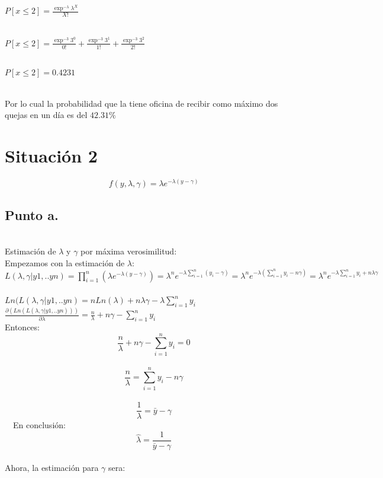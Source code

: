 \documentclass[letterpaper,12pt,onecolumn,titlepage]{article}
\begin{document}
~\\ $P[x\le2]= \frac{\exp^{-\lambda}\lambda^{X}}{X!}$

~\\ $P[x\le2]= \frac{\exp^{-3}3^{0}}{0!} + 
			 \frac{\exp^{-3}3^{1}}{1!} + 
			 \frac{\exp^{-3}3^{2}}{2!}$
			 
~\\ $P[x\le2]= 0.4231 $

~\\ Por lo cual la probabilidad que la tiene oficina de recibir como m\'{a}ximo dos quejas en un d\'{i}a es del {$42.31\%$}

\pagebreak\section{Situaci\'{o}n 2}
$$f(y,\lambda,\gamma)=\lambda e^{-\lambda(y-\gamma)}$$
\subsection{Punto a.}
~\\Estimaci\'{o}n de $\lambda$ y $\gamma$ por m\'{a}xima verosimilitud:
~\\ Empezamos con la estimaci\'{o}n de $\lambda$:
~\\ $L(\lambda,\gamma |y1,..yn)=\prod \limits_{i=1}^{n}(\lambda e^{-\lambda (y-\gamma)})=\lambda^n e^{-\lambda \sum \limits_{i=1}^{n}({y_{i}-\gamma})}=\lambda^n e^{-\lambda (\sum \limits_{i=1}^{n}{y_{i}}-n\gamma)}=\lambda^n e^{-\lambda\sum\limits_{i=1}^{n}{y_{i}}+n\lambda\gamma}$
~\\ $Ln(L(\lambda,\gamma |y1,..yn)=nLn(\lambda)+n\lambda\gamma-\lambda\sum\limits_{i=1}^{n}{y_{i}}$
~\\ $\frac{\partial(Ln(L(\lambda,\gamma |y1,..yn)))}{\partial\lambda}=\frac{n}{\lambda}+n\gamma-\sum\limits_{i=1}^{n}{y_{i}}$
~\\Entonces:
$$\frac{n}{\lambda}+n\gamma-\sum\limits_{i=1}^{n}{y_{i}}=0$$
~\ $$\frac{n}{\lambda}=\sum\limits_{i=1}^{n}{y_{i}}-n\gamma$$
~\ $$\frac{1}{\lambda}=\bar{y}-\gamma$$
~\ En conclusi\'{o}n:
$$\hat{\lambda}=\frac{1}{\bar{y}-\gamma}$$
~\\ Ahora, la estimaci\'{o}n para $\gamma$ sera:
\end{document}
